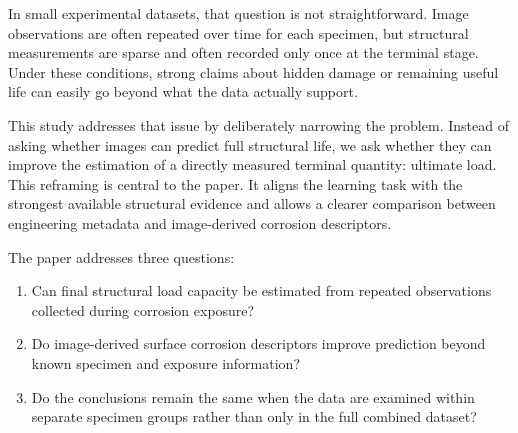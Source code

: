 \documentclass[conference]{IEEEtran}
\begin{document}
In small experimental datasets, that question is not straightforward. Image observations are often repeated over time for each specimen, but structural measurements are sparse and often recorded only once at the terminal stage. Under these conditions, strong claims about hidden damage or remaining useful life can easily go beyond what the data actually support.

This study addresses that issue by deliberately narrowing the problem. Instead of asking whether images can predict full structural life, we ask whether they can improve the estimation of a directly measured terminal quantity: ultimate load. This reframing is central to the paper. It aligns the learning task with the strongest available structural evidence and allows a clearer comparison between engineering metadata and image-derived corrosion descriptors.

The paper addresses three questions:
\begin{enumerate}
    \item Can final structural load capacity be estimated from repeated observations collected during corrosion exposure?
    \item Do image-derived surface corrosion descriptors improve prediction beyond known specimen and exposure information?
    \item Do the conclusions remain the same when the data are examined within separate specimen groups rather than only in the full combined dataset?
\end{enumerate}
\end{document}
